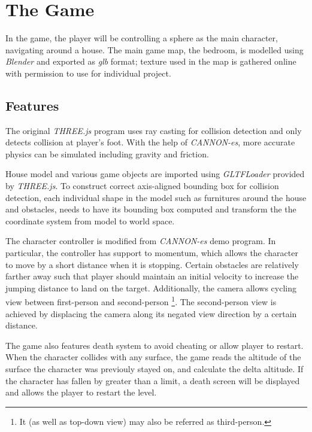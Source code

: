 \documentclass[12pt, a4paper, oneside]{article}
\begin{document}
    \section{The Game}

    In the game, the player will be controlling a sphere as the main character, navigating around a house. The main game map, the bedroom, is modelled using \textit{Blender} and exported as \textit{glb} format; texture used in the map is gathered online \cite{texture_res} with permission to use for individual project.

    \subsection{Features}

    The original \textit{THREE.js} program uses ray casting for collision detection and only detects collision at player's foot. With the help of \textit{CANNON-es}, more accurate physics can be simulated including gravity and friction.
    
    House model and various game objects are imported using \textit{GLTFLoader} provided by \textit{THREE.js}. To construct correct axis-aligned bounding box for collision detection, each individual shape in the model such as furnitures around the house and obstacles, needs to have its bounding box computed and transform the the coordinate system from model to world space.

    The character controller is modified from \textit{CANNON-es} \cite{cannon_controller} demo program. In particular, the controller has support to momentum, which allows the character to move by a short distance when it is stopping. Certain obstacles are relatively farther away such that player should maintain an initial velocity to increase the jumping distance to land on the target. Additionally, the camera allows cycling view between first-person and second-person \footnote{It (as well as top-down view) may also be referred as third-person.}. The second-person view is achieved by displacing the camera along its negated view direction by a certain distance.

    The game also features death system to avoid cheating or allow player to restart. When the character collides with any surface, the game reads the altitude of the surface the character was previouly stayed on, and calculate the delta altitude. If the character has fallen by greater than a limit, a death screen will be displayed and allows the player to restart the level.
\end{document}
